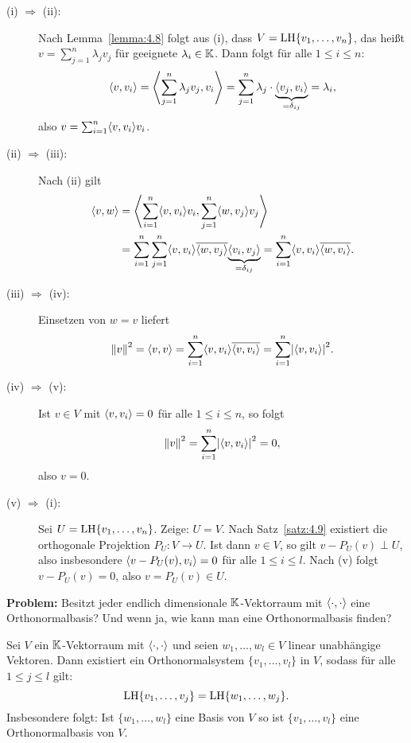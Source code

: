 \begin{beweis}
	\begin{description}
		\item[(i) $\Rightarrow$ (ii):] Nach Lemma~\ref{lemma:4.8} folgt aus (i), dass $V = \operatorname{LH}\{v_1,\dots,v_n\}$, das heißt $v = \sum_{j=1}^{n} \lambda_j v_j$ für geeignete $\lambda_i \in \mathbb{K}$.
		Dann folgt für alle $1 \leq i \leq n$:
		\[
			\left\langle v,v_i\right\rangle = \left\langle\sum_{j=1}^{n} \lambda_j v_j, v_i\right\rangle = \sum_{j=1}^{n} \lambda_j \cdot {\underbrace{\left\langle v_j,v_i\right\rangle}_{=\delta_{ij}}} = \lambda_i,
		\]
		also $v = \sum_{i=1}^{n} \sk{v,v_i} v_i$.
		\item[(ii) $\Rightarrow$ (iii):] Nach (ii) gilt
		\begin{align*}
			\sk{v,w} &= \sk{\sum_{i=1}^{n} \sk{v,v_i} v_i, \sum_{j=1}^{n} \sk{w,v_j} v_j} \\
			&= \sum_{i=1}^{n} \sum_{j=1}^{n} \sk{v,v_i} \ol{\sk{w,v_j}} \Underbrace{\sk{v_i,v_j}}{=\delta_{ij}} = \sum_{i=1}^{n} \sk{v,v_i} \ol{\sk{w,v_i}}.
		\end{align*}
		\item[(iii) $\Rightarrow$ (iv):] Einsetzen von $w = v$ liefert
		\[
			\no{v}^2 = \sk{v,v} = \sum_{i=1}^{n} \sk{v,v_i} \ol{\sk{v,v_i}} = \sum_{i=1}^{n} \abs{\sk{v,v_i}}^2.
		\]
		\item[(iv) $\Rightarrow$ (v):] Ist $v \in V$ mit $\left\langle v,v_i\right\rangle = 0$ für alle $1 \leq i \leq n$, so folgt
		\[
			\no{v}^2 = \sum_{i=1}^{n} \abs{\sk{v,v_i}}^2 = 0,
		\]
		also $v = 0$.
		\item[(v) $\Rightarrow$ (i):] Sei $U = \operatorname{LH}\{v_1,\dots,v_n\}$.
		Zeige: $U = V$.
		Nach Satz~\ref{satz:4.9} existiert die orthogonale Projektion $P_U\colon V \rightarrow U$.
		Ist dann $v \in V$, so gilt $v - P_U(v) \perp U$, also insbesondere $\left\langle v-P_U(v),v_i\right\rangle = 0$ für alle $1 \leq i \leq l$.
		Nach (v) folgt $v - P_U(v) = 0$, also $v = P_U(v) \in U$. 
	\end{description}
\end{beweis}

\textbf{Problem:} Besitzt jeder endlich dimensionale $\mathbb{K}$-Vektorraum mit $\left\langle\cdot,\cdot\right\rangle$ eine Orthonormalbasis?
Und wenn ja, wie kann man eine Orthonormalbasis finden?

\begin{satz}
	\label{satz:4.13}
	Sei $V$ ein $\mathbb{K}$-Vektorraum mit $\left\langle\cdot,\cdot\right\rangle$ und seien $w_1,\dots,w_l \in V$ linear unabhängige Vektoren.
	Dann existiert ein Orthonormalsystem $\{v_1,\dots,v_l\}$ in $V$, sodass für alle $1 \leq j \leq l$ gilt:
	\[
		\operatorname{LH}\{v_1,\dots,v_j\} = \operatorname{LH}\{w_1,\dots,w_j\}.
	\]
	Insbesondere folgt:
	Ist $\{w_1,\dots,w_l\}$ eine Basis von $V$ so ist $\{v_1,\dots,v_l\}$ eine Orthonormalbasis von $V$. 
\end{satz}

